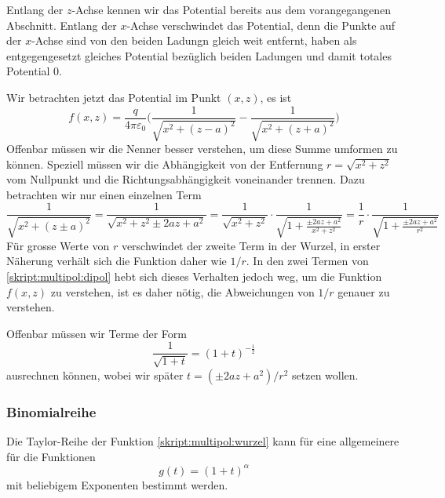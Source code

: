 Entlang der $z$-Achse kennen wir das Potential bereits aus
dem vorangegangenen Abschnitt.
Entlang der $x$-Achse verschwindet das Potential, denn die Punkte
auf der $x$-Achse sind von den beiden Ladungn gleich weit entfernt,
haben als entgegengesetzt gleiches Potential bezüglich beiden Ladungen
und damit totales Potential 0.

Wir betrachten jetzt das Potential im Punkt $(x,z)$, es ist
\begin{equation}
f(x,z)
=
\frac{q}{4\pi\varepsilon_0}
\biggl(
\frac{1}{\sqrt{x^2 + (z-a)^2}}
-
\frac{1}{\sqrt{x^2 + (z+a)^2}}
\biggr)
\label{skript:multipol:dipol}
\end{equation}
Offenbar müssen wir die Nenner besser verstehen, um diese Summe 
umformen zu können.
Speziell müssen wir die Abhängigkeit von der Entfernung
$r=\sqrt{x^2+z^2}$ vom Nullpunkt
und die Richtungsabhängigkeit voneinander trennen.
Dazu betrachten wir nur einen einzelnen Term
\[
\frac{1}{\sqrt{x^2+(z\pm a)^2}}
=
\frac{1}{\sqrt{x^2+z^2\pm 2az+a^2}}
=
\frac{1}{\sqrt{x^2+z^2}} \cdot \frac{1}{\sqrt{1+\frac{\pm 2az+a^2}{x^2+z^2}}}
=
\frac{1}{r} \cdot \frac{1}{\sqrt{1+\frac{\pm 2az+a^2}{r^2}}}
\]
Für grosse Werte von $r$ verschwindet der zweite Term in der Wurzel,
in erster Näherung verhält sich die Funktion daher wie $1/r$.
In den zwei Termen von \eqref{skript:multipol:dipol} hebt sich dieses
Verhalten jedoch weg, um die Funktion $f(x,z)$ zu verstehen, ist es
daher nötig, die Abweichungen von $1/r$ genauer zu verstehen.

Offenbar müssen wir Terme der Form
\begin{equation}
\frac{1}{\sqrt{1+t}}
=
(1+t)^{-\frac12}
\label{skript:multipol:wurzel}
\end{equation}
ausrechnen können, wobei wir später $t=(\pm2az+a^2)/r^2$ setzen wollen.

\subsubsection{Binomialreihe}
Die Taylor-Reihe der Funktion \eqref{skript:multipol:wurzel}
kann für eine allgemeinere für die Funktionen
\begin{equation}
g(t)=(1+t)^\alpha
\end{equation}
mit beliebigem Exponenten bestimmt werden.

